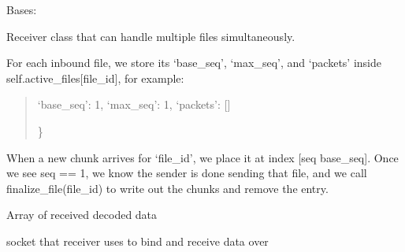 \documentclass[letterpaper,10pt,oneside,english,openany]{sphinxmanual}
\begin{document}
\begin{fulllineitems}
\label{\detokenize{modules:receiver_rdt.Receiver}}
\pysigstartsignatures
\pysiglinewithargsret
{}
{\sphinxparamcomma {}}
{}
\pysigstopsignatures
\sphinxAtStartPar
Bases: 

\sphinxAtStartPar
Receiver class that can handle multiple files simultaneously.

\sphinxAtStartPar
For each inbound file, we store its ‘base\_seq’, ‘max\_seq’, and ‘packets’
inside self.active\_files{[}file\_id{]}, for example:
\begin{quote}
\begin{description}
\sphinxAtStartPar
‘base\_seq’: \sphinxhyphen{}1,
‘max\_seq’:  \sphinxhyphen{}1,
‘packets’:  {[}{]}

\end{description}

\sphinxAtStartPar
\}
\end{quote}

\sphinxAtStartPar
When a new chunk arrives for ‘file\_id’, we place it at index {[}seq \sphinxhyphen{} base\_seq{]}.
Once we see seq == \sphinxhyphen{}1, we know the sender is done sending that file, and we
call finalize\_file(file\_id) to write out the chunks and remove the entry.

\begin{fulllineitems}
\label{\detokenize{modules:receiver_rdt.Receiver.packets}}
\pysigstartsignatures
\pysigline
{}
\pysigstopsignatures
\sphinxAtStartPar
Array of received decoded data

\end{fulllineitems}


\begin{fulllineitems}
\label{\detokenize{modules:receiver_rdt.Receiver.soc}}
\pysigstartsignatures
\pysigline
{}
\pysigstopsignatures
\sphinxAtStartPar
socket that receiver uses to bind and receive data over


\end{fulllineitems}
\end{fulllineitems}
\end{document}
